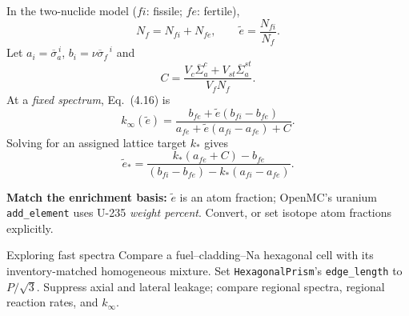 \documentclass{ne630handout}
\begin{document}
In the two-nuclide model ($fi$: fissile; $fe$: fertile),
\[
 N_f=N_{fi}+N_{fe},\qquad \widetilde e=\frac{N_{fi}}{N_f}.
\]
Let $a_i=\overline\sigma_a^{\,i}$, $b_i=\overline{\nu\sigma_f}^{\,i}$ and
\[
 C=\frac{V_c\overline\Sigma_a^c+V_{st}\overline\Sigma_a^{st}}{V_fN_f}.
\]
At a \emph{fixed spectrum}, Eq.\ (4.16) is
\[
 k_\infty(\widetilde e)=
 \frac{b_{fe}+\widetilde e(b_{fi}-b_{fe})}
 {a_{fe}+\widetilde e(a_{fi}-a_{fe})+C}.
\]
Solving for an assigned lattice target $k_*$ gives
\[
 \widetilde e_*=
 \frac{k_*(a_{fe}+C)-b_{fe}}
 {(b_{fi}-b_{fe})-k_*(a_{fi}-a_{fe})}.
\]

\textbf{Match the enrichment basis:} $\widetilde e$ is an atom fraction; OpenMC's uranium \texttt{add\_element} uses U-235 \emph{weight percent}. Convert, or set isotope atom fractions explicitly.
\colend
\begin{OpenMCExplore}{Exploring fast spectra}
Compare a fuel--cladding--Na hexagonal cell with its inventory-matched homogeneous mixture. Set \texttt{HexagonalPrism}'s \texttt{edge\_length} to $P/\sqrt3$. Suppress axial and lateral leakage; compare regional spectra, regional reaction rates, and $k_\infty$.
\end{OpenMCExplore}
\end{document}
